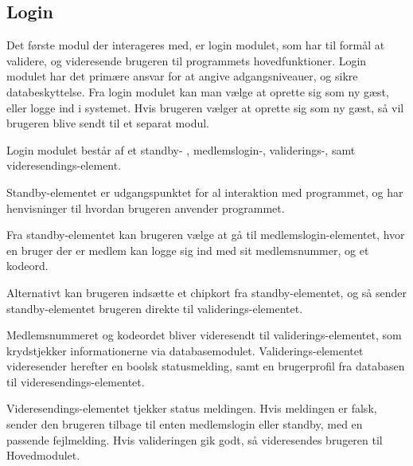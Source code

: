 \subsection{Login}
\label{sub:login}


Det første modul der interageres med, er login modulet, som har til formål at validere, og videresende brugeren til programmets hovedfunktioner. Login modulet har det primære ansvar for at angive adgangsniveauer, og sikre databeskyttelse. Fra login modulet kan man vælge at oprette sig som ny gæst, eller logge ind i systemet. Hvis brugeren vælger at oprette sig som ny gæst, så vil brugeren blive sendt til et separat modul.

Login modulet består af et standby- , medlemslogin-, validerings-, samt videresendings-element.

Standby-elementet er udgangspunktet for al interaktion med programmet, og har henvisninger til hvordan brugeren anvender programmet. 

Fra standby-elementet kan brugeren vælge at gå til medlemslogin-elementet, hvor en bruger der er medlem kan logge sig ind med sit medlemsnummer, og et kodeord.

Alternativt kan brugeren indsætte et chipkort fra standby-elementet, og så sender standby-elementet brugeren direkte til validerings-elementet.

Medlemsnummeret og kodeordet bliver videresendt til validerings-elementet, som krydstjekker informationerne via databasemodulet. Validerings-elementet videresender herefter en boolsk statusmelding, samt en brugerprofil fra databasen til videresendings-elementet.

Videresendings-elementet tjekker status meldingen. Hvis meldingen er falsk, sender den brugeren tilbage til enten medlemslogin eller standby, med en passende fejlmelding. Hvis valideringen gik godt, så videresendes brugeren til Hovedmodulet.